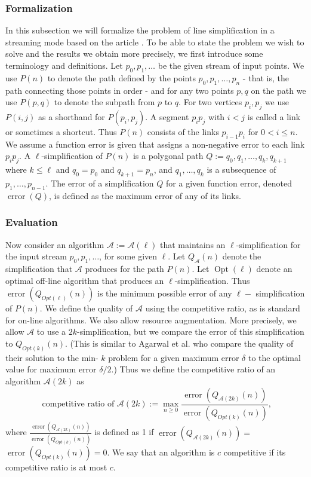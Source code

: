 \documentclass[twoside,12pt, a4paper]{report}
\begin{document}
\subsubsection{Formalization}
In this subsection we will formalize the problem of line simplification in a streaming mode based on the article \cite{abam2007streaming}.
To be able to state the problem we wish to solve and the results we obtain more precisely, we first introduce some terminology and definitions.
Let $p_0, p_1, \ldots$ be the given stream of input points. We use $P(n)$ to denote the path defined by the points
$p_0, p_1, \ldots, p_n$ - that is, the path connecting those points in order - and for any two points $p, q$ on the path we use
$P(p, q)$ to denote the subpath from $p$ to $q$. For two vertices $p_i, p_j$ we use $P(i, j)$ as a shorthand for $P\left(p_i, p_j\right)$.
A segment $p_i p_j$ with $i<j$ is called a link or sometimes a shortcut. Thus $P(n)$ consists of the links $p_{i-1} p_i$ for $0<i \leqslant n$.
We assume a function error is given that assigns a non-negative error to each link $p_i p_j$.
A $\ell$-simplification of $P(n)$ is a polygonal path $Q:=q_0, q_1, \ldots, q_k, q_{k+1}$ where
$k \leqslant \ell$ and $q_0=p_0$ and $q_{k+1}=p_n$, and $q_1, \ldots, q_k$ is a subsequence of
$p_1, \ldots, p_{n-1}$. The error of a simplification $Q$ for a given function error, denoted
$\operatorname{error}(Q)$, is defined as the maximum error of any of its links.

\subsubsection{Evaluation}
\cite{abam2007streaming}  Now consider an algorithm $\mathcal{A}:=\mathcal{A}(\ell)$ that maintains an $\ell$-simplification for the input stream $p_0, p_1, \ldots$,
for some given $\ell$. Let $Q_{\mathcal{A}}(n)$ denote the simplification that $\mathcal{A}$ produces for the path $P(n)$. Let $\operatorname{Opt}(\ell)$
denote an optimal off-line algorithm that produces an $\ell$-simplification. Thus $\operatorname{error}\left(Q_{O p t(\ell)}(n)\right)$ is the minimum possible
error of any $\ell-$ simplification of $P(n)$. We define the quality of $\mathcal{A}$ using the competitive ratio, as is standard for on-line algorithms.
We also allow resource augmentation. More precisely, we allow $\mathcal{A}$ to use a $2k$-simplification, but we compare the error of this simplification
to $Q_{O p t(k)}(n)$. (This is similar to Agarwal et al. \cite{agarwal2005near} who compare the quality of their solution to the min- $k$ problem for a given maximum error $\delta$
to the optimal value for maximum error $\delta / 2$.) Thus we define the competitive ratio of an algorithm $\mathcal{A}(2 k)$ as
$$
\text { competitive ratio of } \mathcal{A}(2 k):=\max _{n \geqslant 0} \frac{\operatorname{error}\left(Q_{\mathcal{A}(2 k)}(n)\right)}{\operatorname{error}\left(Q_{O p t(k)}(n)\right)},
$$
where $\frac{\operatorname{error}\left(Q_{\mathcal{A}(2 k)}(n)\right)}{\operatorname{error}\left(Q_{O p t(k)}(n)\right)}$ is defined as
1 if $\operatorname{error}\left(Q_{\mathcal{A}(2 k)}(n)\right)=$ $\operatorname{error}\left(Q_{O p t(k)}(n)\right)=0$.
We say that an algorithm is $c$ competitive if its competitive ratio is at most $c$.
\end{document}
